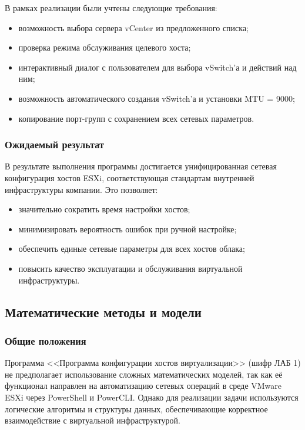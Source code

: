 В рамках реализации были учтены следующие требования:

\begin{itemize}
    \item возможность выбора сервера vCenter из предложенного списка;
    \item проверка режима обслуживания целевого хоста;
    \item интерактивный диалог с пользователем для выбора vSwitch'а и действий над ним;
    \item возможность автоматического создания vSwitch'а и установки MTU = 9000;
    \item копирование порт-групп с сохранением всех сетевых параметров.
\end{itemize}

\subsubsection{Ожидаемый результат}
В результате выполнения программы достигается унифицированная сетевая конфигурация хостов ESXi, соответствующая стандартам внутренней инфраструктуры компании. Это позволяет:

\begin{itemize}
    \item значительно сократить время настройки хостов;
    \item минимизировать вероятность ошибок при ручной настройке;
    \item обеспечить единые сетевые параметры для всех хостов облака;
    \item повысить качество эксплуатации и обслуживания виртуальной инфраструктуры.
\end{itemize}

\subsection{Математические методы и модели}

\subsubsection{Общие положения}
Программа <<Программа конфигурации хостов виртуализации>> (шифр ЛАБ 1) не предполагает использование сложных математических моделей, так как её функционал направлен на автоматизацию сетевых операций в среде VMware ESXi через PowerShell и PowerCLI. Однако для реализации задачи используются логические алгоритмы и структуры данных, обеспечивающие корректное взаимодействие с виртуальной инфраструктурой.

